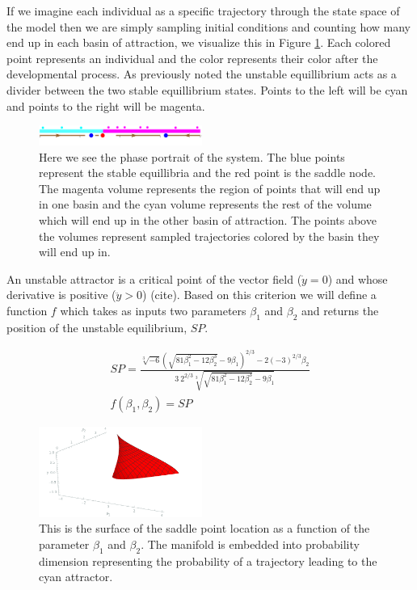 \documentclass[letterpaper]{article}
\begin{document}
If we imagine each individual as a specific trajectory through
the state space of the model then we are simply sampling initial conditions 
and counting how many end up in each basin of attraction, we visualize this 
in Figure \ref{basins}. Each
colored point represents an individual and the color represents their color after
the developmental process. As previously noted the unstable equillibrium acts as a
divider between the two stable equillibrium states. 
Points to
the left will be cyan and points to the right will be magenta. 

\begin{figure}[t]
\begin{center}
\includegraphics[width=2.1in,angle=0]{./basins.png}
\caption{Here we see the phase portrait of the system. The blue points represent
the stable equillibria and the red point is the saddle node. The magenta volume
represents the region of points that will end up in one basin and the cyan volume
represents the rest of the volume which will end up in the other basin of attraction.
The points above the volumes represent sampled trajectories colored by the 
basin they will end up in.}
\label{basins}
\end{center}
\end{figure}

An unstable attractor is a critical point of the vector field ($\dot{y} = 0$) and
whose derivative is positive ($\ddot{y} > 0$) (cite). 
Based on this criterion we will define a function $f$ which 
takes as inputs two parameters $\beta_1$ and $\beta_2$ and returns the position
of the unstable equilibrium, $SP$.

\begin{eqnarray}
SP = \frac{\sqrt[3]{-6} 
\left(\sqrt{81 \beta_1^2-12 \beta_2^3}-9 \beta_1\right)^{2/3}-2 
(-3)^{2/3} \beta_2}{3\ 2^{2/3} \sqrt[3]
{\sqrt{81 \beta_1^2-12 \beta_2^3}-9 \beta_1}}\\
f(\beta_1,\beta_2) = SP
\end{eqnarray}

\begin{figure}[t]
\begin{center}
\includegraphics[width=2.1in,angle=0]{./saddle_cubic.png}
\caption{This is the surface of the saddle point location as a function of
the parameter $\beta_1$ and $\beta_2$. The manifold is embedded into probability
dimension representing the probability of a trajectory leading to the cyan attractor.}
\label{cubic_saddle}
\end{center}
\end{figure}
\end{document}
